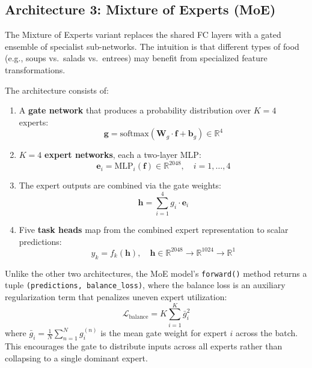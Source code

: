 \documentclass[11pt,a4paper]{article}
\begin{document}
\subsection{Architecture 3: Mixture of Experts (MoE)}

The Mixture of Experts variant replaces the shared FC layers with a gated ensemble of specialist sub-networks. The intuition is that different types of food (e.g., soups vs.\ salads vs.\ entrees) may benefit from specialized feature transformations.

The architecture consists of:
\begin{enumerate}
  \item A \textbf{gate network} that produces a probability distribution over $K = 4$ experts:
  \begin{equation}
    \mathbf{g} = \text{softmax}(\mathbf{W}_g \cdot \mathbf{f} + \mathbf{b}_g) \in \mathbb{R}^{4}
  \end{equation}
  \item $K = 4$ \textbf{expert networks}, each a two-layer MLP:
  \begin{equation}
    \mathbf{e}_i = \text{MLP}_i(\mathbf{f}) \in \mathbb{R}^{2048}, \quad i = 1, \ldots, 4
  \end{equation}
  \item The expert outputs are combined via the gate weights:
  \begin{equation}
    \mathbf{h} = \sum_{i=1}^{4} g_i \cdot \mathbf{e}_i
  \end{equation}
  \item Five \textbf{task heads} map from the combined expert representation to scalar predictions:
  \begin{equation}
    \hat{y}_k = f_k(\mathbf{h}), \quad \mathbf{h} \in \mathbb{R}^{2048} \rightarrow \mathbb{R}^{1024} \rightarrow \mathbb{R}^{1}
  \end{equation}
\end{enumerate}

Unlike the other two architectures, the MoE model's \texttt{forward()} method returns a tuple \texttt{(predictions, balance\_loss)}, where the balance loss is an auxiliary regularization term that penalizes uneven expert utilization:
\begin{equation}
  \mathcal{L}_{\text{balance}} = K \sum_{i=1}^{K} \bar{g}_i^2
\end{equation}
where $\bar{g}_i = \frac{1}{N}\sum_{n=1}^{N} g_i^{(n)}$ is the mean gate weight for expert $i$ across the batch. This encourages the gate to distribute inputs across all experts rather than collapsing to a single dominant expert.
\end{document}
